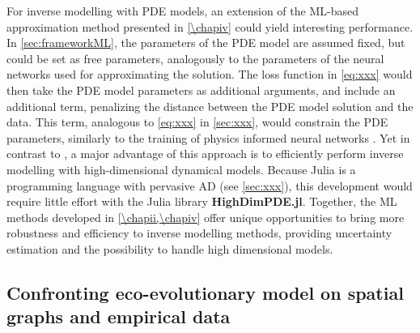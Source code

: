 For inverse modelling with PDE models, an extension of the ML-based approximation method presented in \cref{\chapiv} could yield interesting performance.
% 
In \cref{sec:frameworkML}, the parameters of the PDE model are assumed fixed, but could be set as free parameters, analogously to the parameters of the neural networks used for approximating the solution. The loss function in \cref{eq:xxx} would then take the PDE model parameters as additional arguments, and include an additional term, penalizing the distance between the PDE model solution and the data. This term, analogous to \cref{eq:xxx} in \cref{sec:xxx}, would constrain the PDE parameters, similarly to the training of physics informed neural networks \citep{Raissi2019,Yazdani2020}.
% 
Yet in contrast to \cite{Raissi2019,Yazdani2020}, a major advantage of this approach is to efficiently perform inverse modelling with high-dimensional dynamical models. Because Julia is a programming language with pervasive AD (see \cref{sec:xxx}), this development would require little effort with the Julia library \textbf{HighDimPDE.jl}.
% 
Together, the ML methods developed in \cref{\chapii,\chapiv} offer unique opportunities to bring more robustness and efficiency to inverse modelling methods, providing uncertainty estimation and the possibility to handle high dimensional models.





\subsection{Confronting eco-evolutionary model on spatial graphs and empirical data}

